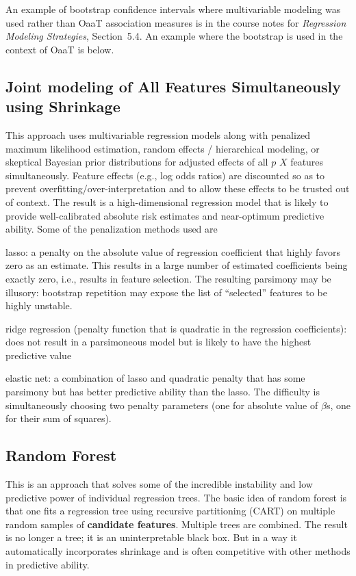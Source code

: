 An example of bootstrap confidence intervals where multivariable modeling was used rather than OaaT association measures is in the course notes for \emph{Regression Modeling Strategies}, Section~5.4.  An example where the bootstrap is used in the context of OaaT is below.

\subsection{Joint modeling of All Features Simultaneously using Shrinkage}
This approach uses multivariable regression models along with penalized maximum likelihood estimation, random effects / hierarchical modeling, or skeptical Bayesian prior distributions for adjusted effects of all $p$ $X$ features simultaneously.  Feature effects (e.g., log odds ratios) are discounted so as to prevent overfitting/over-interpretation and to allow these effects to be trusted out of context.  The result is a high-dimensional regression model that is likely to provide well-calibrated absolute risk estimates and near-optimum predictive ability.  Some of the penalization methods used are
\be
\item lasso: a penalty on the absolute value of regression coefficient that highly favors zero as an estimate.  This results in a large number of estimated coefficients being exactly zero, i.e., results in feature selection.  The resulting parsimony may be illusory: bootstrap repetition may expose the list of ``selected'' features to be highly unstable.
\item ridge regression (penalty function that is quadratic in the regression coefficients): does not result in a parsimoneous model but is likely to have the highest predictive value
\item elastic net: a combination of lasso and quadratic penalty that has some parsimony but has better predictive ability than the lasso.  The difficulty is simultaneously choosing two penalty parameters (one for absolute value of $\beta$s, one for their sum of squares).
\ee

\subsection{Random Forest}
This is an approach that solves some of the incredible instability and low predictive power of individual regression trees.  The basic idea of random forest is that one fits a regression tree using recursive partitioning (CART) on multiple random samples of \textbf{candidate features}.  Multiple trees are combined.  The result is no longer a tree; it is an uninterpretable black box.  But in a way it automatically incorporates shrinkage and is often competitive with other methods in predictive ability.

